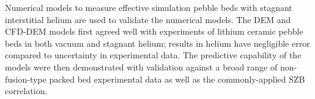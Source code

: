 {Numerical models to measure effective simulation pebble beds with stagnant interstitial helium are used to validate the numerical models. The DEM and CFD-DEM models first agreed well with experiments of lithium ceramic pebble beds in both vacuum and stagnant helium; results in helium have negligible error compared to uncertainty in experimental data. The predictive capability of the models were then demonstrated with validation against a broad range of non-fusion-type packed bed experimental data as well as the commonly-applied SZB correlation. 


}

